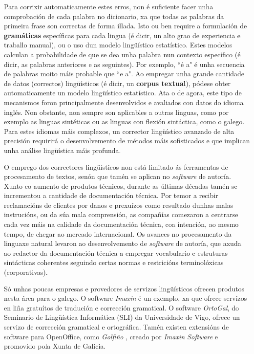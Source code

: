 \begin{multicols}{2}
Para corrixir automaticamente estes erros, non é suficiente facer unha comprobación de cada palabra no dicionario, xa que todas as palabras da primeira frase son correctas de forma illada. Isto ou ben require a formulación de \textbf{gramáticas} específicas para cada lingua (é dicir, un alto grao de experiencia e traballo manual), ou o uso dun modelo lingüístico estatístico. Estes modelos calculan a probabilidade de que se dea unha palabra nun contexto específico (é dicir, as palabras anteriores e as seguintes). Por exemplo, “é a" é unha secuencia de palabras moito máis probable que “e a". Ao empregar unha grande cantidade de datos (correctos) lingüísticos (é dicir, un \textbf{corpus textual}), pódese obter automaticamente un modelo lingüístico estatístico. Ata o de agora, este tipo de mecanismos foron principalmente desenvolvidos e avaliados con datos do idioma inglés. Non obstante, non sempre son aplicables a outras linguas, como por exemplo as linguas sintéticas ou as linguas con flexión sintáctica, como o galego. Para estes idiomas máis complexos, un corrector lingüístico avanzado de alta precisión requirirá o desenvolvemento de métodos máis sofisticados e que implican unha análise lingüística máis profunda.


O emprego dos correctores lingüísticos non está limitado ás ferramentas de procesamento de textos, senón que tamén se aplican no \textit{software} de autoría. Xunto co aumento de produtos técnicos, durante as últimas décadas tamén se incrementou a cantidade de documentación técnica. Por temor a recibir reclamacións de clientes por danos e prexuízos como resultado dunhas malas instrucións, ou da súa mala comprensión, as compañías comezaron a centrarse cada vez máis na calidade da documentación técnica, coa intención, ao mesmo tempo, de chegar ao mercado internacional. Os avances no procesamento da linguaxe natural levaron ao desenvolvemento de \textit{software} de autoría, que axuda ao redactor da documentación técnica a empregar vocabulario e estruturas sintácticas coherentes seguindo certas normas e restricións terminolóxicas (corporativas). 



Só unhas poucas empresas e provedores de servizos lingüísticos ofrecen produtos nesta área para o galego. O software \textit{Imaxin} \cite{GAL-Nota21}  é un exemplo, xa que ofrece servizos en liña gratuítos de tradución e corrección gramatical. O software \textit{OrtoGal}, do Seminario de Lingüística Informática (SLI) \cite{GAL-Nota22} da Universidade de Vigo, ofrece un servizo de corrección gramatical e ortográfica. Tamén existen extensións de software para OpenOffice, como \textit{Golfiño} \cite{GAL-Nota23}, creado por \textit{Imaxin Software} e promovido pola Xunta de Galicia.


\end{multicols}
